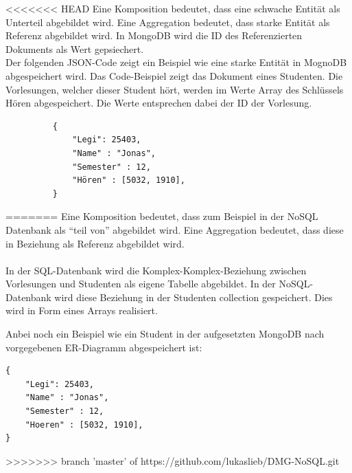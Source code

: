 <<<<<<< HEAD
Eine Komposition bedeutet, dass eine schwache Entität als Unterteil abgebildet
wird. Eine Aggregation bedeutet, dass starke Entität  als Referenz abgebildet
wird. In MongoDB wird die ID des Referenzierten Dokuments als Wert gepsiechert.
\\
Der folgenden JSON-Code zeigt ein Beispiel wie eine starke Entität
in MognoDB abgespeichert wird. Das Code-Beispiel zeigt das Dokument eines
Studenten. Die Vorlesungen, welcher dieser Student hört, werden im Werte Array
des Schlüssels Hören abgespeichert. Die Werte entsprechen dabei der ID der
Vorlesung.
 \begin{figure} [h]
	\begin{verbatim}
	{
		"Legi": 25403,
		"Name" : "Jonas",
		"Semester" : 12,
		"Hören" : [5032, 1910],
	}
	\end{verbatim}
	\label{cod:vorlesung}
\end{figure}
=======
\noindent
Eine Komposition bedeutet, dass zum Beispiel in der NoSQL Datenbank als ``teil von''
abgebildet wird. Eine Aggregation bedeutet, dass diese in Beziehung  als
Referenz abgebildet wird.
\\\\
In der SQL-Datenbank wird die Komplex-Komplex-Beziehung zwischen Vorlesungen und Studenten als eigene Tabelle abgebildet. In der NoSQL-Datenbank wird diese Beziehung in der Studenten collection gespeichert. Dies wird in Form eines Arrays realisiert.

\newpage
\noindent
Anbei noch ein Beispiel wie ein Student in der aufgesetzten MongoDB nach vorgegebenen ER-Diagramm abgespeichert ist:
\begin{lstlisting}[basicstyle=\scriptsize]
{
	"Legi": 25403,
	"Name" : "Jonas",
	"Semester" : 12,
	"Hoeren" : [5032, 1910],
}
\end{lstlisting}
>>>>>>> branch 'master' of https://github.com/lukaslieb/DMG-NoSQL.git




